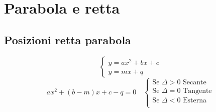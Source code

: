 \chapter{Parabola e retta}
\section{Posizioni retta parabola}
\begin{equation}
\begin{cases}
y=ax^2+bx+c\\
y=mx+q
\end{cases}
\end{equation}
\begin{equation}
ax^2+(b-m)x+c-q=0\quad\begin{cases}
\text{Se $\Delta >0$ Secante}\\
\text{Se $\Delta =0$ Tangente}\\
\text{Se $\Delta <0$ Esterna}\\
\end{cases}
\end{equation}
